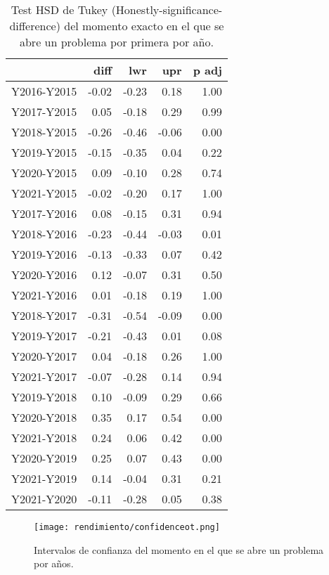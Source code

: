 \begin{table}[H]
\centering
\caption{Test HSD de Tukey (Honestly-significance-difference) del momento exacto en el que se abre un problema por primera por año.}
\label{tab:Tukeynewcomer}
\begin{tabular}{rrrrr}
  \hline
 & diff & lwr & upr & p adj \\ 
  \hline
Y2016-Y2015 & -0.02 & -0.23 & 0.18 & 1.00 \\ 
  Y2017-Y2015 & 0.05 & -0.18 & 0.29 & 0.99 \\ 
  Y2018-Y2015 & -0.26 & -0.46 & -0.06 & 0.00 \\ 
  Y2019-Y2015 & -0.15 & -0.35 & 0.04 & 0.22 \\ 
  Y2020-Y2015 & 0.09 & -0.10 & 0.28 & 0.74 \\ 
  Y2021-Y2015 & -0.02 & -0.20 & 0.17 & 1.00 \\ 
  Y2017-Y2016 & 0.08 & -0.15 & 0.31 & 0.94 \\ 
  Y2018-Y2016 & -0.23 & -0.44 & -0.03 & 0.01 \\ 
  Y2019-Y2016 & -0.13 & -0.33 & 0.07 & 0.42 \\ 
  Y2020-Y2016 & 0.12 & -0.07 & 0.31 & 0.50 \\ 
  Y2021-Y2016 & 0.01 & -0.18 & 0.19 & 1.00 \\ 
  Y2018-Y2017 & -0.31 & -0.54 & -0.09 & 0.00 \\ 
  Y2019-Y2017 & -0.21 & -0.43 & 0.01 & 0.08 \\ 
  Y2020-Y2017 & 0.04 & -0.18 & 0.26 & 1.00 \\ 
  Y2021-Y2017 & -0.07 & -0.28 & 0.14 & 0.94 \\ 
  Y2019-Y2018 & 0.10 & -0.09 & 0.29 & 0.66 \\ 
  Y2020-Y2018 & 0.35 & 0.17 & 0.54 & 0.00 \\ 
  Y2021-Y2018 & 0.24 & 0.06 & 0.42 & 0.00 \\ 
  Y2020-Y2019 & 0.25 & 0.07 & 0.43 & 0.00 \\ 
  Y2021-Y2019 & 0.14 & -0.04 & 0.31 & 0.21 \\ 
  Y2021-Y2020 & -0.11 & -0.28 & 0.05 & 0.38 \\ 
   \hline
\end{tabular}
\end{table}

\begin{figure}[H]
    \centering
    \texttt{[image: rendimiento/confidenceot.png]}
    \caption{Intervalos de confianza del momento en el que se abre un problema por años.}
    \label{fig:confidencenewcomer}
\end{figure}

